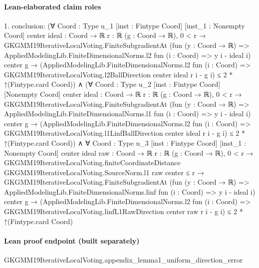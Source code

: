 \documentclass[10pt]{article}
\begin{document}
\paragraph{Lean-elaborated claim roles}\begin{ReviewVerbatim}
1. conclusion: (∀ {Coord : Type u_1} [inst : Fintype Coord] [inst_1 : Nonempty Coord] {center ideal : Coord → ℝ} {r : ℝ}
    (g : Coord → ℝ),
    0 < r →
      GKGMM19IterativeLocalVoting.FiniteSubgradientAt
          (fun (y : Coord → ℝ) => AppliedModelingLib.FiniteDimensionalNorms.l2 fun (i : Coord) => y i - ideal i) center
          g →
        (AppliedModelingLib.FiniteDimensionalNorms.l2 fun (i : Coord) =>
            GKGMM19IterativeLocalVoting.l2BallDirection center ideal r i - g i) ≤
          2 * ↑(Fintype.card Coord)) ∧
  (∀ {Coord : Type u_2} [inst : Fintype Coord] [Nonempty Coord] {center ideal : Coord → ℝ} {r : ℝ} (g : Coord → ℝ),
      0 < r →
        GKGMM19IterativeLocalVoting.FiniteSubgradientAt
            (fun (y : Coord → ℝ) => AppliedModelingLib.FiniteDimensionalNorms.l1 fun (i : Coord) => y i - ideal i)
            center g →
          (AppliedModelingLib.FiniteDimensionalNorms.l2 fun (i : Coord) =>
              GKGMM19IterativeLocalVoting.l1LinfBallDirection center ideal r i - g i) ≤
            2 * ↑(Fintype.card Coord)) ∧
    ∀ {Coord : Type u_3} [inst : Fintype Coord] [inst_1 : Nonempty Coord] {center ideal raw : Coord → ℝ} {r : ℝ}
      (g : Coord → ℝ),
      0 < r →
        GKGMM19IterativeLocalVoting.finiteCoordinateDistance GKGMM19IterativeLocalVoting.SourceNorm.l1 raw center ≤ r →
          GKGMM19IterativeLocalVoting.FiniteSubgradientAt
              (fun (y : Coord → ℝ) => AppliedModelingLib.FiniteDimensionalNorms.linf fun (i : Coord) => y i - ideal i)
              center g →
            (AppliedModelingLib.FiniteDimensionalNorms.l2 fun (i : Coord) =>
                GKGMM19IterativeLocalVoting.linfL1RawDirection center raw r i - g i) ≤
              2 * ↑(Fintype.card Coord)
\end{ReviewVerbatim}

\paragraph{Lean proof endpoint (built separately)}\begin{ReviewVerbatim}
GKGMM19IterativeLocalVoting.appendix_lemma1_uniform_direction_error
\end{ReviewVerbatim}
\end{document}
